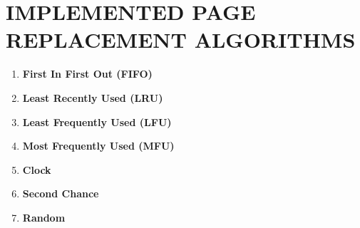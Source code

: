 \documentclass[12pt, oneside, a4paper]{report}
\begin{document}
\section*{IMPLEMENTED PAGE REPLACEMENT ALGORITHMS}
\begin{enumerate}
\item \textbf{First In First Out (FIFO)}
\item \textbf{Least Recently Used (LRU)}
\item \textbf{Least Frequently Used (LFU)}
\item \textbf{Most Frequently Used (MFU)}
\item \textbf{Clock}
\item \textbf{Second Chance}
\item \textbf{Random}
\end{enumerate}
\end{document}
